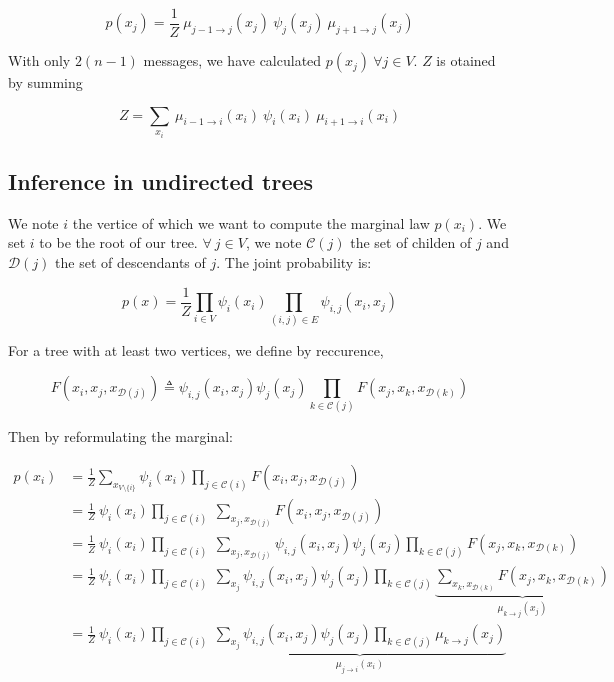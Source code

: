 \documentclass[12pt,a4paper]{report}
\begin{document}
\begin{equation}
	\boxed{ p(x_j) = \frac{1}{Z} \ \mu_{j-1 \rightarrow j} (x_{j}) \ \psi_j (x_j) \ \mu_{j+1 \rightarrow j} (x_{j})}
\end{equation}

With only \( 2(n-1) \) messages, we have calculated \( p(x_j) \ \forall j \in V\). \( Z \) is otained by summing 

\begin{equation}
	Z = \sum_{x_i} \ \mu_{i-1 \rightarrow i} (x_{i}) \ \psi_i (x_i) \ \mu_{i+1 \rightarrow i} (x_{i})
\end{equation}

\subsection{Inference in undirected trees}

We note \( i \) the vertice of which we want to compute the marginal law \(p(x_i)\). We set \( i \) to be the root of our tree. \( \forall \ j \in V \), we note \( \mathcal{C}(j) \) the set of childen of \( j \) and \( \mathcal{D}(j) \) the set of  descendants of \( j \). The joint probability is:

\begin{equation}
	p(x) = \frac{1}{Z} \prod_{i \in V} \psi_i (x_i) \prod_{(i,j) \in E} \psi_{i,j} (x_i,x_j)
\end{equation}

For a tree with at least two vertices, we define by reccurence, 

\begin{equation}
	F(x_i,x_j,x_{\mathcal{D}(j)}) \triangleq \psi_{i,j} (x_i,x_j) \psi_j (x_j) \prod_{k \in \mathcal{C}(j)} F(x_j,x_k,x_{\mathcal{D}(k)})
\end{equation}

Then by reformulating the marginal:

\begin{align}
	p(x_i)  	&= \frac{1}{Z} \sum_{x_{V \setminus \{i\}}} \psi_i (x_i) \prod_{j \in \mathcal{C}(i)} F(x_i,x_j,x_{\mathcal{D}(j)}) \\
			&= \frac{1}{Z} \ \psi_i (x_i) \prod_{j \in \mathcal{C}(i)} \ \sum_{x_j , x_{\mathcal{D}(j)}} F(x_i,x_j,x_{\mathcal{D}(j)}) \\
			&= \frac{1}{Z} \ \psi_i (x_i) \prod_{j \in \mathcal{C}(i)} \ \sum_{x_j , x_{\mathcal{D}(j)}} \psi_{i,j} (x_i,x_j) \psi_j (x_j) \prod_{k \in \mathcal{C}(j)} F(x_j,x_k,x_{\mathcal{D}(k)})\\
			&= \frac{1}{Z} \ \psi_i (x_i) \prod_{j \in \mathcal{C}(i)} \ \sum_{x_j} \psi_{i,j} (x_i,x_j) \psi_j (x_j) \prod_{k \in \mathcal{C}(j)} 
							\underbrace{\sum_{x_k , x_{\mathcal{D}(k)}} F(x_j,x_k,x_{\mathcal{D}(k)})}_{\mu_{k \rightarrow j}(x_j)}\\
			&= \frac{1}{Z} \ \psi_i (x_i) \prod_{j \in \mathcal{C}(i)} \ 
						\underbrace{\sum_{x_j} \psi_{i,j} (x_i,x_j) \psi_j (x_j) \prod_{k \in \mathcal{C}(j)} \mu_{k \rightarrow j}(x_j)}_{\mu_{j \rightarrow i}(x_i)}
\end{align}
\end{document}
